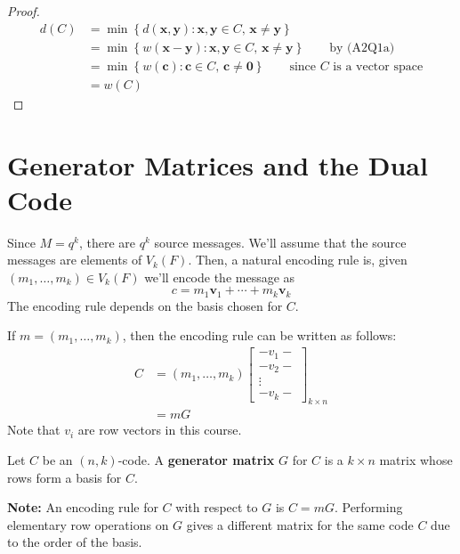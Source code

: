 \begin{proof}
    \begin{align*}
        d(C)
         & =\min \left\{ d(\bm{x},\bm{y}):\bm{x},\bm{y}\in C,\,\bm{x}\neq \bm{y}\right\}                                     \\
         & =\min \left\{ w(\bm{x}-\bm{y}):\bm{x},\bm{y}\in C,\,\bm{x}\neq \bm{y}\right\}\qquad\text{by (A2Q1a)}              \\
         & =\min 
         \left\{ w(\bm{c}):\bm{c}\in C,\,\bm{c}\neq \bm{0}\right\}\qquad\text{since $C$ is a vector space} \\
         & =w(C)
    \end{align*}
\end{proof}

\section{Generator Matrices and the Dual Code}

Since $ M=q^k $, there are $ q^k $ source messages. We'll assume that the source
messages are elements of $ V_k(F) $. Then, a natural encoding rule is,
given $ (m_1,\ldots ,m_k)\in V_k(F) $ we'll encode the message as
\[ c=m_1\bm{v}_1+\cdots+m_k\bm{v}_k \]
The encoding rule depends on the basis chosen for $ C $.

If $ m=(m_1,\ldots ,m_k) $, then the encoding rule can be written as follows:
\begin{align*}
    C & =(m_1,\ldots ,m_k)
    \begin{bmatrix}
        -v_1-  \\
        -v_2-  \\
        \vdots \\
        -v_k-
    \end{bmatrix}_{k\times n} \\
      & =mG
\end{align*}
Note that $ v_i $ are row vectors in this course.

\begin{defbox}
    \begin{definition}
        Let $ C $ be an $ (n,k) $-code. A \textbf{generator matrix} $ G $
        for $ C $ is a $ k\times n $ matrix whose rows form a basis for $ C $.
    \end{definition} \end{defbox}

\textbf{Note:} An encoding rule for $ C $ with respect to $ G $ is $ C=mG $.
Performing elementary row operations on $ G $ gives
a different matrix for the same code $ C $ due to the order of the basis.
